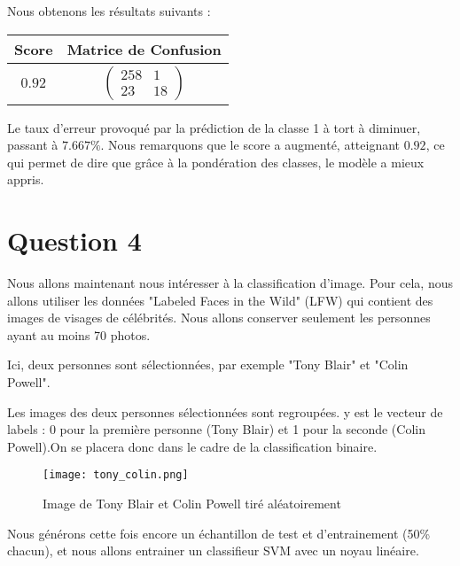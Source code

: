 \documentclass{article}
\begin{document}
Nous obtenons les résultats suivants :

\begin{center}
\begin{tabular}{|c|c|}
        \hline
         Score & Matrice de Confusion \\
        \hline
         $0.92 $ & $\begin{pmatrix} 258 & 1 \\ 23 & 18 \end{pmatrix}$ \\
        \hline
\end{tabular}
\end{center}

Le taux d'erreur provoqué par la prédiction de la classe 1 à tort à diminuer, passant à $7.667 \%$.
Nous remarquons que le score a augmenté, atteignant $0.92$, ce qui permet de dire que grâce à la pondération des classes, le modèle a mieux appris.














\section{Question 4}

Nous allons maintenant nous intéresser à la classification d'image. Pour cela, nous allons utiliser les données "Labeled Faces in the Wild" (LFW) qui contient des images de visages de célébrités. Nous allons conserver seulement les personnes ayant au moins 70 photos. 


Ici, deux personnes sont sélectionnées, par exemple "Tony Blair" et "Colin Powell".

Les images des deux personnes sélectionnées sont regroupées.
y est le vecteur de labels : 0 pour la première personne (Tony Blair) et 1 pour la seconde (Colin Powell).On se placera donc dans le cadre de la classification binaire.


\begin{figure}[H]
    \centering
    \texttt{[image: tony\_colin.png]}
    \caption{Image de Tony Blair et Colin Powell tiré aléatoirement }
    \label{fig:enter-label}
\end{figure}

Nous générons cette fois encore un échantillon de test et d'entrainement (50\% chacun), et nous allons entrainer un classifieur SVM avec un noyau linéaire.
\end{document}
